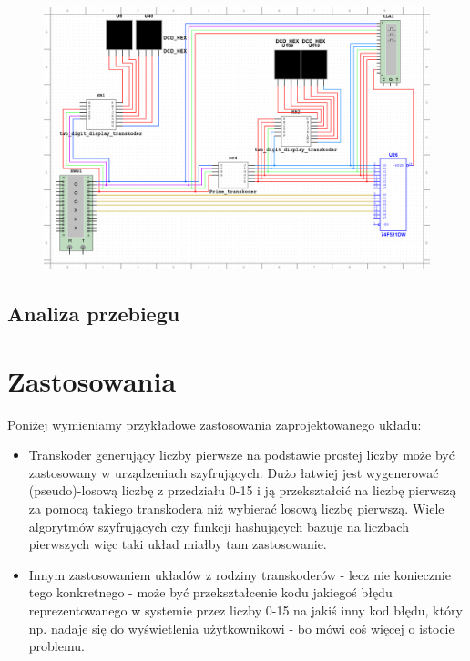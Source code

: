 \documentclass[a4paper]{article}
\begin{document}
\begin{figure}[H]
  \centering
  \includegraphics[width=\linewidth]{schemat.png}
 \end{figure}

\subsection{Analiza przebiegu}


\section{Zastosowania}
Poniżej wymieniamy przykładowe zastosowania zaprojektowanego układu:
\begin{itemize}
  \item Transkoder generujący liczby pierwsze na podstawie prostej liczby może być zastosowany w urządzeniach 
      szyfrujących. Dużo łatwiej jest wygenerować (pseudo)-losową liczbę z przedziału 0-15 i ją przekształcić na
      liczbę pierwszą za pomocą takiego transkodera niż wybierać losową liczbę pierwszą. Wiele algorytmów szyfrujących
      czy funkcji hashujących bazuje na liczbach pierwszych więc taki układ miałby tam zastosowanie.
  \item Innym zastosowaniem układów z rodziny transkoderów - lecz nie koniecznie tego konkretnego - może być 
      przekształcenie kodu jakiegoś błędu reprezentowanego w systemie przez liczby 0-15 na jakiś inny kod błędu, 
      który np. nadaje się do wyświetlenia użytkownikowi - bo mówi coś więcej o istocie problemu.
\end{itemize}
\end{document}
